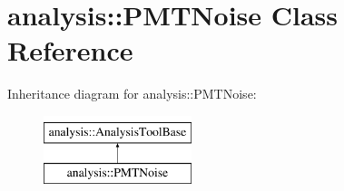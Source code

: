 \hypertarget{classanalysis_1_1PMTNoise}{}\section{analysis\+:\+:P\+M\+T\+Noise Class Reference}
\label{classanalysis_1_1PMTNoise}
Inheritance diagram for analysis\+:\+:P\+M\+T\+Noise\+:\begin{figure}[H]
\begin{center}
\leavevmode
\includegraphics[height=2.000000cm]{classanalysis_1_1PMTNoise}
\end{center}
\end{figure}

